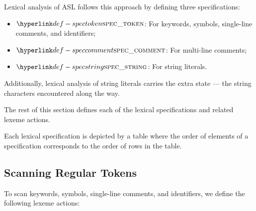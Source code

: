 Lexical analysis of ASL follows this approach by defining three specifications:
\begin{itemize}
  \item $\spectoken$: For keywords, symbols, single-line comments, and identifiers;
  \item $\speccomment$: For multi-line comments;
  \item $\specstring$: For string literals.
\end{itemize}

Additionally, lexical analysis of string literals carries the extra state ---
the string characters encountered along the way.

The rest of this section defines each of the lexical specifications and related lexeme actions.

Each lexical specification is depicted by a table where the order of elements
of a specification corresponds to the order of rows in the table.

\subsection{Scanning Regular Tokens}
To scan keywords, symbols, single-line comments, and identifiers,
we define the following lexeme actions:

